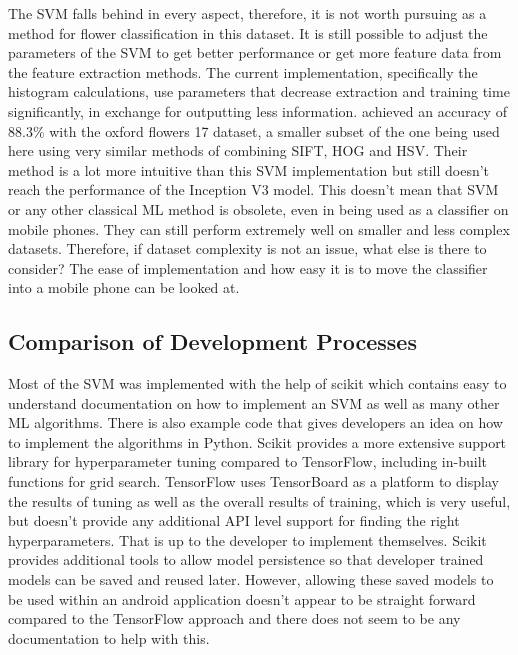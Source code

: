\documentclass[12pt,a4paper]{report}
\begin{document}
\par

The SVM falls behind in every aspect, therefore, it is not worth pursuing as a method for flower classification in this 
dataset. It is still possible to adjust the parameters of the SVM to get better performance or get more feature data 
from the feature extraction methods. The current implementation, specifically the histogram calculations, use parameters
that decrease extraction and training time significantly, in exchange for outputting less information. 
\citet{Nilsback2008}
achieved an accuracy of 88.3\% with the oxford flowers 17 dataset, a smaller subset of the one being used here using 
very similar methods of combining SIFT, HOG and HSV. Their method is a lot more intuitive than this SVM
implementation but still doesn't reach the performance of the Inception V3 model. This doesn't mean that SVM or any 
other classical ML method is obsolete, even in being used as a classifier on mobile phones. They can still
perform extremely well on smaller and less complex datasets. Therefore, if dataset complexity is not an issue, what 
else is there to consider? The ease of implementation and how easy it is to move the classifier 
into a mobile phone can be looked at.

\subsection{Comparison of Development Processes}
Most of the SVM was implemented with the help of scikit which contains easy to understand documentation on how to 
implement an SVM as well as many other ML algorithms. There is also example code that gives developers an 
idea on how to implement the algorithms in Python. Scikit provides a more extensive support library for hyperparameter 
tuning compared to TensorFlow, including in-built functions for grid search. TensorFlow uses TensorBoard as a platform 
to display the results of tuning as well as the overall results of training, which is very useful, but doesn't provide 
any additional API level support for finding the right hyperparameters. That is up to the developer to implement 
themselves. Scikit provides additional tools to allow model persistence so that developer trained models can be saved 
and reused later. However, allowing these saved models to be used within an android application doesn't appear to be 
straight forward compared to the TensorFlow approach and there does not seem to be any documentation to help with this. 
\end{document}
